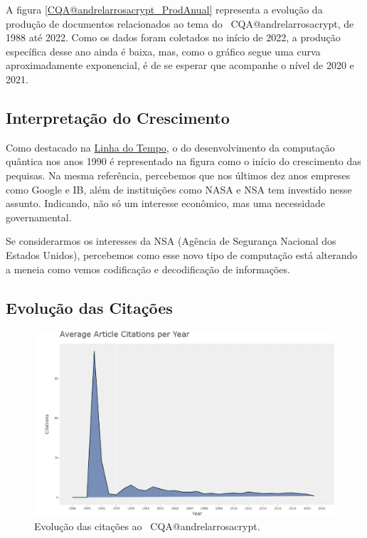 A figura \ref{CQA@andrelarrosacrypt_ProdAnual} representa a evolução da produção de documentos relacionados ao tema do \dataset\ CQA@andrelarrosacrypt, de 1988 até 2022. Como os dados foram coletados no início de 2022, a produção específica desse ano ainda é baixa, mas, como o gráfico segue uma curva aproximadamente exponencial, é de se esperar que acompanhe o nível de 2020 e 2021.



\subsection{Interpretação do Crescimento}

Como destacado na \href{https://www.quthought.com/post/history-of-quantum-computing-a-timeline}{Linha do Tempo}, o do desenvolvimento da computação quântica nos anos 1990 é representado na figura como o início do crescimento das pequisas. Na mesma referência, percebemos que nos últimos dez anos empreses como Google e IB, além de instituições como NASA e NSA tem investido nesse assunto. Indicando, não só um interesse econômico, mas uma necessidade governamental.

Se considerarmos os interesses da NSA (Agência de Segurança Nacional dos Estados Unidos), percebemos como esse novo tipo de computação está alterando a meneia como vemos codificação e decodificação de informações. 


\subsection{Evolução das Citações}

\begin{figure}
    \centering
    \includegraphics[width=1\textwidth]{experiments/andrelarrosacrypt/AnaliseBibliometrica/CriptografiaQuantica/imagens/CQA@andrelarrosacrypt_CitaAnual.png}
    \caption{Evolução das citações ao \dataset\ CQA@andrelarrosacrypt.}
    \label{CQA@andrelarrosacrypt_CitaAnual}
\end{figure}

